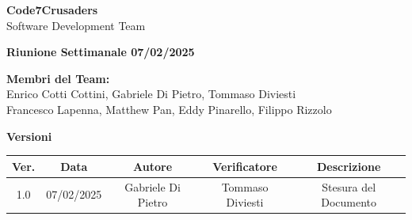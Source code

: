 \documentclass{article}
\begin{document}
\begin{titlepage}
    {\Huge \textbf{Code7Crusaders}}\\
    \vspace{0.5cm}
    {\Large Software Development Team}\\
    \vspace{2cm}
        
        {\large \textbf{Riunione Settimanale 07/02/2025}}\\
    \vspace{5cm}                           %
    
    
    \textbf{Membri del Team:}\\
    Enrico Cotti Cottini, Gabriele Di Pietro, Tommaso Diviesti \\
    Francesco Lapenna, Matthew Pan, Eddy Pinarello, Filippo Rizzolo \\
    \vspace{0.5cm}
    
    \vspace{1cm}
\end{titlepage}



\newpage
\begin{table}[h!]
\centering
\textbf{Versioni} \\ %
\vspace{2mm} %
\begin{tabular}{|c|c|c|c|c|}
    \hline
    \textbf{Ver.} & \textbf{Data} & \textbf{Autore} & \textbf{Verificatore} & \textbf{Descrizione} \\
    \hline
    1.0 & 07/02/2025 & Gabriele Di Pietro & Tommaso Diviesti & Stesura del Documento \\ 
    \hline                                  %
\end{tabular}
\end{table}



\newpage
\end{document}
